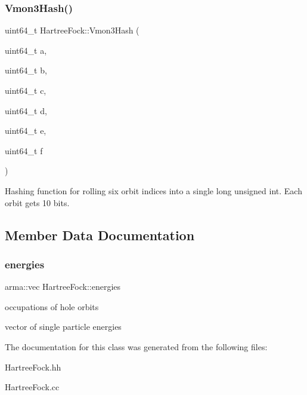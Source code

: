 \subsubsection{\texorpdfstring{Vmon3\+Hash()}{Vmon3Hash()}}
{\footnotesize\ttfamily uint64\+\_\+t Hartree\+Fock\+::\+Vmon3\+Hash (\begin{DoxyParamCaption}\item[{uint64\+\_\+t}]{a,  }\item[{uint64\+\_\+t}]{b,  }\item[{uint64\+\_\+t}]{c,  }\item[{uint64\+\_\+t}]{d,  }\item[{uint64\+\_\+t}]{e,  }\item[{uint64\+\_\+t}]{f }\end{DoxyParamCaption})}

Hashing function for rolling six orbit indices into a single long unsigned int. Each orbit gets 10 bits. 

\subsection{Member Data Documentation}
\mbox{\label{classHartreeFock_a415fc1fbbba3a6a84d47e31ed18323c9}} 
\subsubsection{\texorpdfstring{energies}{energies}}
{\footnotesize\ttfamily arma\+::vec Hartree\+Fock\+::energies}



occupations of hole orbits 

vector of single particle energies 

The documentation for this class was generated from the following files\+:\begin{DoxyCompactItemize}
\item 
Hartree\+Fock.\+hh\item 
Hartree\+Fock.\+cc\end{DoxyCompactItemize}
